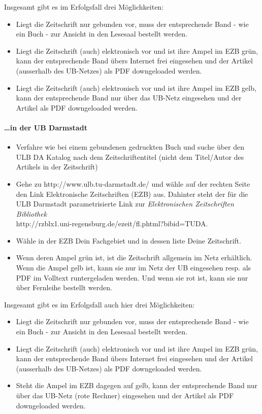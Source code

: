 \documentclass[DIV=calc,BCOR=5mm,11pt,headings=small,oneside,abstract=false, toc=bib]{scrartcl}
\begin{document}
Insgesamt gibt es im Erfolgsfall drei Möglichkeiten:
\begin{itemize}
  \item Liegt die Zeitschrift nur gebunden vor, muss der entsprechende Band -
  wie ein Buch - zur Ansicht in den Lesesaal bestellt werden.
  \item Liegt die Zeitschrift (auch) elektronisch vor und ist ihre Ampel im
  EZB grün, kann der entsprechende Band übers Internet frei eingesehen und der
  Artikel (ausserhalb des UB-Netzes) als PDF downgeloaded werden.
  \item Liegt die Zeitschrift (auch) elektronisch vor und ist ihre Ampel im
  EZB gelb, kann der entsprechende Band nur über das UB-Netz eingesehen und
  der Artikel als PDF downgeloaded werden.
\end{itemize}  

\paragraph{\ldots in der UB Darmstadt}

\begin{itemize}
  \item Verfahre wie bei einem gebundenen gedruckten Buch und suche über den ULB
  DA Katalog nach dem Zeitschriftentitel (nicht dem Titel/Autor des Artikels
  in der Zeitschrift)
  \item  Gehe zu {\ttfamily http://www.ulb.tu-darmstadt.de/} und wähle auf der
  rechten Seite den Link \glqq{}Elektronische Zeitschriften (EZB)\grqq{} aus.
  Dahinter steht der für die ULB Darmstadt parametrisierte Link zur
  \emph{Elektronischen Zeitschriften Bibliothek} \\{\ttfamily
  http://rzblx1.uni-regensburg.de/ezeit/fl.phtml?bibid=TUDA}.
  \item Wähle in der EZB Dein Fachgebiet und in dessen liste Deine Zeitschrift.
  \item Wenn deren Ampel grün ist, ist die Zeitschrift allgemein im Netz
  erhältlich. Wenn die Ampel gelb ist, kann sie nur im Netz der UB eingesehen
  resp. als PDF im Volltext runtergeladen werden. Und wenn sie rot ist, kann sie
  nur über Fernleihe bestellt werden.
\end{itemize}

Insgesamt gibt es im Erfolgsfall auch hier drei Möglichkeiten:
\begin{itemize}
  \item Liegt die Zeitschrift nur gebunden vor, muss der entsprechende Band -
  wie ein Buch - zur Ansicht in den Lesesaal bestellt werden.
  \item Liegt die Zeitschrift (auch) elektronisch vor und ist ihre Ampel im
  EZB grün, kann der entsprechende Band übers Internet frei eingesehen und der
  Artikel (ausserhalb des UB-Netzes) als PDF downgeloaded werden.
  \item Steht die Ampel im EZB dagegen auf gelb, kann der entsprechende Band nur
  über das UB-Netz (rote Rechner) eingesehen und der Artikel als PDF
  downgeloaded werden.
\end{itemize}  
\end{document}
